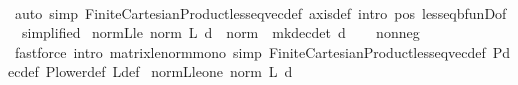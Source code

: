 \begin{isabellebody}
\ \ \isamarkupfalse%
\ {\isacharparenleft}{\kern0pt}auto\ simp{\isacharcolon}{\kern0pt}\ Finite{\isacharunderscore}{\kern0pt}Cartesian{\isacharunderscore}{\kern0pt}Product{\isachardot}{\kern0pt}less{\isacharunderscore}{\kern0pt}eq{\isacharunderscore}{\kern0pt}vec{\isacharunderscore}{\kern0pt}def\ axis{\isacharunderscore}{\kern0pt}def\ intro{\isacharbang}{\kern0pt}{\isacharcolon}{\kern0pt}\ {\isasymP}pos\ less{\isacharunderscore}{\kern0pt}eq{\isacharunderscore}{\kern0pt}bfunD{\isacharbrackleft}{\kern0pt}of\ {}{\isacharcomma}{\kern0pt}\ simplified{\isacharbrackright}{\kern0pt}{\isacharparenright}{\kern0pt}%
\endisatagproof
{\isafoldproof}%
%
\isadelimproof
\isanewline
%
\endisadelimproof
\isanewline
{}\isamarkupfalse%
\ norm{\isacharunderscore}{\kern0pt}{\isasymP}\isactrlsub L{\isacharunderscore}{\kern0pt}le{\isacharcolon}{\kern0pt}\ {\isachardoublequoteopen}norm\ {\isacharparenleft}{\kern0pt}{\isasymP}\isactrlsub L\ d{\isacharparenright}{\kern0pt}\ {\isasymle}\ norm\ {\isacharparenleft}{\kern0pt}{\isasymP}\ {\isacharparenleft}{\kern0pt}mk{\isacharunderscore}{\kern0pt}dec{\isacharunderscore}{\kern0pt}det\ d{\isacharparenright}{\kern0pt}{\isacharparenright}{\kern0pt}{\isachardoublequoteclose}\isanewline
%
\isadelimproof
\ \ %
\endisadelimproof
%
\isatagproof
{}\isamarkupfalse%
\ nonneg{\isacharunderscore}{\kern0pt}{\isasymP}\ \isanewline
\ \ \isamarkupfalse%
\ {\isacharparenleft}{\kern0pt}fastforce\ intro{\isacharbang}{\kern0pt}{\isacharcolon}{\kern0pt}\ matrix{\isacharunderscore}{\kern0pt}le{\isacharunderscore}{\kern0pt}norm{\isacharunderscore}{\kern0pt}mono\ simp{\isacharcolon}{\kern0pt}\ Finite{\isacharunderscore}{\kern0pt}Cartesian{\isacharunderscore}{\kern0pt}Product{\isachardot}{\kern0pt}less{\isacharunderscore}{\kern0pt}eq{\isacharunderscore}{\kern0pt}vec{\isacharunderscore}{\kern0pt}def\ P{\isacharunderscore}{\kern0pt}dec{\isacharunderscore}{\kern0pt}def\ P{\isacharunderscore}{\kern0pt}lower{\isacharunderscore}{\kern0pt}def\ {\isasymP}\isactrlsub L{\isacharunderscore}{\kern0pt}def{\isacharparenright}{\kern0pt}%
\endisatagproof
{\isafoldproof}%
%
\isadelimproof
\isanewline
%
\endisadelimproof
\isanewline
{}\isamarkupfalse%
\ norm{\isacharunderscore}{\kern0pt}{\isasymP}\isactrlsub L{\isacharunderscore}{\kern0pt}le{\isacharunderscore}{\kern0pt}one{\isacharcolon}{\kern0pt}\ {\isachardoublequoteopen}norm\ {\isacharparenleft}{\kern0pt}{\isasymP}\isactrlsub L\ d{\isacharparenright}{\kern0pt}\ {\isasymle}\ {}{\isachardoublequoteclose}\isanewline

\end{isabellebody}
